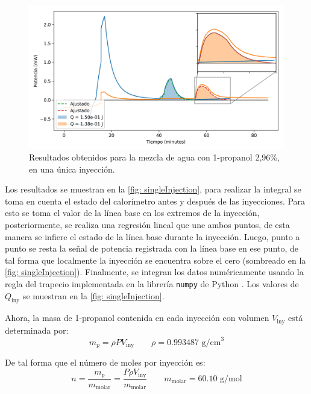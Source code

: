 		\begin{figure}[h]
			\centering
			\includegraphics[width=\linewidth]{../Data/ChemicalCalibrations/singlePropanol}
			\caption{Resultados obtenidos para la mezcla de agua con 1-propanol 2,96\%, en una \'unica inyecci\'on.}
			\label{fig: singleInjection}
		\end{figure}
		
		Los resultados se muestran en la \autoref{fig: singleInjection}, para realizar la integral se toma en cuenta el estado del calor\'imetro antes y despu\'es de las inyecciones. Para esto se toma el valor de la l\'inea base en los extremos de la inyecci\'on, posteriormente, se realiza una regresi\'on lineal que une ambos puntos, de esta manera se infiere el estado de la l\'inea base durante la inyecci\'on. Luego, punto a punto se resta la se\~nal de potencia registrada con la l\'inea base en ese punto, de tal forma que localmente la inyecci\'on se encuentra sobre el cero (sombreado en la \autoref{fig: singleInjection}). Finalmente, se integran los datos num\'ericamente usando la regla del trapecio implementada en la librer\'ia \texttt{numpy} de Python \cite{landau2008survey, walt2011numpy}. Los valores de $Q_\text{iny}$ se muestran en la \autoref{fig: singleInjection}.
		
		Ahora, la masa de 1-propanol contenida en cada inyecci\'on con volumen $V_\text{iny}$ est\'a determinada por:
		\begin{equation}
			m_p = \rho PV_\text{iny} \qquad \rho = 0.993487 \text{ g/cm}^3
		\end{equation}
		
		De tal forma que el n\'umero de moles por inyecci\'on es:
		\begin{equation}
			n = \dfrac{m_p}{m_\text{molar}} = \dfrac{P\rho V_\text{iny}}{m_\text{molar}} \qquad m_\text{molar} = 60.10 \text{ g/mol}
		\end{equation}
		
